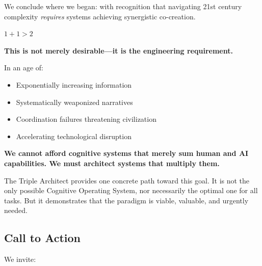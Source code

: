 \documentclass[11pt,a4paper]{article}
\theoremstyle{definition}
\theoremstyle{remark}
\begin{document}
We conclude where we began: with recognition that navigating 21st century complexity \textit{requires} systems achieving synergistic co-creation.

\begin{mdframed}[style=divinemandate, frametitle={Foundational Axiom}]
\begin{center}
\Huge $1 + 1 > 2$
\end{center}

\vspace{0.5em}

\normalsize
\textbf{This is not merely desirable—it is the engineering requirement.}

\vspace{0.5em}

In an age of:
\begin{itemize}
    \item Exponentially increasing information
    \item Systematically weaponized narratives
    \item Coordination failures threatening civilization
    \item Accelerating technological disruption
\end{itemize}

\textbf{We cannot afford cognitive systems that merely sum human and AI capabilities. We must architect systems that multiply them.}
\end{mdframed}

The Triple Architect provides one concrete path toward this goal. It is not the only possible Cognitive Operating System, nor necessarily the optimal one for all tasks. But it demonstrates that the paradigm is viable, valuable, and urgently needed.

\subsection{Call to Action}

We invite:
\end{document}
